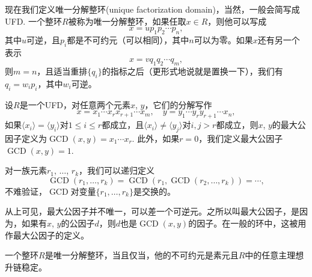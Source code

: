 \begin{para}[唯一分解整环]
现在我们定义唯一分解整环(unique factorization domain)，当然，一般会简写成UFD. 一个整环$R$被称为唯一分解整环，如果任取$x\in R$，则他可以写成
\[
	x=up_1p_2\cdots p_n,
\]
其中$u$可逆，且$p_i$都是不可约元（可以相同），其中$n$可以为零。如果$x$还有另一个表示
\[
	x=vq_1q_2\cdots q_m,
\]
则$m=n$，且适当重排$\{q_i\}$的指标之后（更形式地说就是置换一下），我们有$q_i=w_ip_i$，其中$w_i$可逆。
\end{para}

\begin{para}[最大公因子]
	设$R$是一个UFD，对任意两个元素$x$, $y$，它们的分解写作
	\[
		x=x_1\cdots x_rx_{r+1}\cdots x_m,\quad
		y=y_1\cdots y_ry_{r+1}\cdots x_n,
	\]
	如果$\langle x_i\rangle=\langle y_i\rangle$对$1\leq i\leq r$都成立，且$\langle x_i\rangle\neq \langle y_j\rangle$对$i,j>r$都成立，则$x$, $y$的最大公因子定义为$\operatorname{GCD}(x,y)=x_1\cdots x_r$.
	此外，如果$r=0$，我们定义最大公因子$\operatorname{GCD}(x,y)=1$.

	对一族元素$r_1$, $\dots$, $r_k$，我们可以递归定义
	\[
		\operatorname{GCD}(r_1,\dots,r_k)=
		\operatorname{GCD}(r_1,\operatorname{GCD}(r_2,\dots,r_k))=\cdots,
	\]
	不难验证，$\operatorname{GCD}$对变量$\{r_1,\dots,r_k\}$是交换的。
\end{para}

从上可见，最大公因子并不唯一，可以差一个可逆元。之所以叫最大公因子，是因为，如果有$x$, $y$的公因子$d$，则$d$也是$\operatorname{GCD}(x,y)$的因子。在一般的环中，这被用作最大公因子的定义。

\begin{pro}
一个整环$R$是唯一分解整环，当且仅当，他的不可约元是素元且$R$中的任意主理想升链稳定。
\end{pro}

